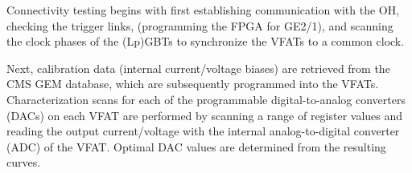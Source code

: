 \documentclass[a4paper,11pt]{article}
\begin{document}
\begin{table}[!htp]
\centering
\caption{\label{tab:FEprocedure}Frontend electronics testing procedure.}
{}
\end{table}

Connectivity testing begins with first establishing communication with the OH, checking the trigger links, (programming the FPGA for GE2/1), and scanning the clock phases of the (Lp)GBTs to synchronize the VFATs to a common clock.



Next, calibration data (internal current/voltage biases) are retrieved from the CMS GEM database, which are subsequently programmed into the VFATs. Characterization scans for each of the programmable digital-to-analog converters (DACs) on each VFAT are performed by scanning a range of register values and reading the output current/voltage with the internal analog-to-digital converter (ADC) of the VFAT. Optimal DAC values are determined from the resulting curves.
\end{document}
